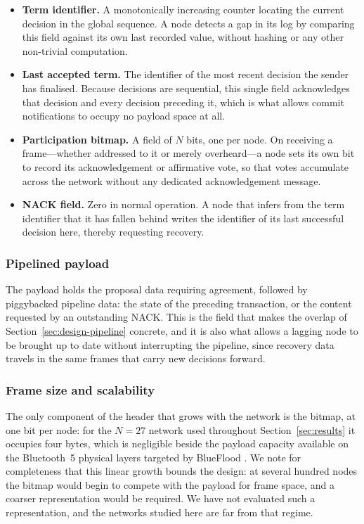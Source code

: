 \documentclass[journal]{IEEEtran}
\newcommand{\Nnodes}{N}                   %
\begin{document}
\begin{itemize}
\item \textbf{Term identifier.} A monotonically increasing counter
locating the current decision in the global sequence. A node detects a gap
in its log by comparing this field against its own last recorded value,
without hashing or any other non-trivial computation.

\item \textbf{Last accepted term.} The identifier of the most recent
decision the sender has finalised. Because decisions are sequential, this
single field acknowledges that decision and every decision preceding it,
which is what allows commit notifications to occupy no payload space at
all.

\item \textbf{Participation bitmap.} A field of $\Nnodes$ bits, one per
node. On receiving a frame---whether addressed to it or merely
overheard---a node sets its own bit to record its acknowledgement or
affirmative vote, so that votes accumulate across the network without any
dedicated acknowledgement message.

\item \textbf{NACK field.} Zero in normal operation. A node that infers
from the term identifier that it has fallen behind writes the identifier
of its last successful decision here, thereby requesting recovery.
\end{itemize}

\subsubsection{Pipelined payload}
The payload holds the proposal data requiring agreement, followed by
piggybacked pipeline data: the state of the preceding transaction, or the
content requested by an outstanding NACK. This is the field that makes
the overlap of Section~\ref{sec:design-pipeline} concrete, and it is also
what allows a lagging node to be brought up to date without interrupting
the pipeline, since recovery data travels in the same frames that carry
new decisions forward.

\subsubsection{Frame size and scalability}
The only component of the header that grows with the network is the
bitmap, at one bit per node: for the $\Nnodes = 27$ network used
throughout Section~\ref{sec:results} it occupies four bytes, which is
negligible beside the payload capacity available on the Bluetooth~5
physical layers targeted by BlueFlood \cite{alnahas21blueflood}. We note
for completeness that this linear growth bounds the design: at several
hundred nodes the bitmap would begin to compete with the payload for frame
space, and a coarser representation would be required. We have not
evaluated such a representation, and the networks studied here are far
from that regime.
\end{document}
